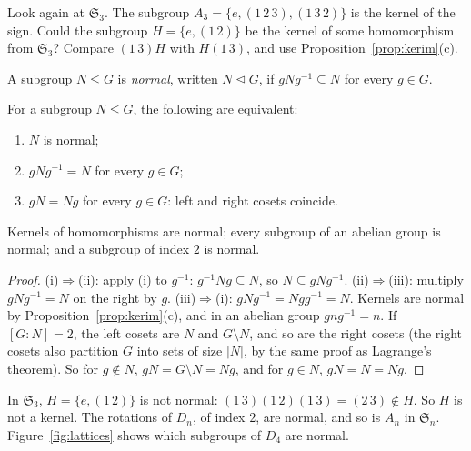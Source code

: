 \begin{think}
Look again at $\mathfrak S_3$. The subgroup $A_3=\{e,(1\,2\,3),(1\,3\,2)\}$ is the kernel of the sign. Could the subgroup $H=\{e,(1\,2)\}$ be the kernel of some homomorphism from $\mathfrak S_3$? Compare $(1\,3)H$ with $H(1\,3)$, and use Proposition~\ref{prop:kerim}(c).
\end{think}

\begin{definition}
A subgroup $N\le G$ is \emph{normal}, written $N\trianglelefteq G$, if $gNg^{-1}\subseteq N$ for every $g\in G$.
\end{definition}

\begin{proposition}\label{prop:normal}
For a subgroup $N\le G$, the following are equivalent:
\begin{enumerate}[label=(\roman*)]
\item $N$ is normal;
\item $gNg^{-1}=N$ for every $g\in G$;
\item $gN=Ng$ for every $g\in G$: left and right cosets coincide.
\end{enumerate}
Kernels of homomorphisms are normal; every subgroup of an abelian group is normal; and a subgroup of index $2$ is normal.
\end{proposition}
\begin{proof}
(i)$\Rightarrow$(ii): apply (i) to $g^{-1}$: $g^{-1}Ng\subseteq N$, so $N\subseteq gNg^{-1}$. (ii)$\Rightarrow$(iii): multiply $gNg^{-1}=N$ on the right by $g$. (iii)$\Rightarrow$(i): $gN g^{-1}=Ngg^{-1}=N$.
Kernels are normal by Proposition~\ref{prop:kerim}(c), and in an abelian group $gng^{-1}=n$. If $[G:N]=2$, the left cosets are $N$ and $G\setminus N$, and so are the right cosets (the right cosets also partition $G$ into sets of size $|N|$, by the same proof as Lagrange's theorem). So for $g\notin N$, $gN=G\setminus N=Ng$, and for $g\in N$, $gN=N=Ng$.
\end{proof}

In $\mathfrak S_3$, $H=\{e,(1\,2)\}$ is not normal: $(1\,3)(1\,2)(1\,3)=(2\,3)\notin H$. So $H$ is not a kernel. The rotations of $D_n$, of index $2$, are normal, and so is $A_n$ in $\mathfrak S_n$. Figure~\ref{fig:lattices} shows which subgroups of $D_4$ are normal.

